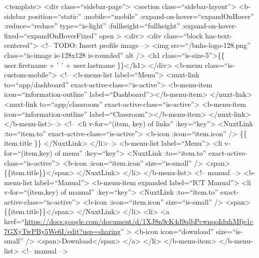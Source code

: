 \documentclass[11pt]{article}
\author{James Paul Pandan}
\date{\today}
\title{}
\begin{document}
\tableofcontents

<template>
  <div class=``sidebar-page''>
    <section class=``sidebar-layout''>
      <b-sidebar
        position=``static''
        :mobile=``mobile''
        :expand-on-hover=``expandOnHover''
        :reduce=``reduce''
        type=``is-light''
        :fullheight=``fullheight''
        :expand-on-hover-fixed=``expandOnHoverFixed''
        open
      >
        <div>
          <div class=``block has-text-centered''>
            <!-- TODO: Insert profile image -->
            <img src=``/bnhs-logo-128.png'' class=``is-image is-128x128 is-rounded'' alt />
            <h1 class=``is-size-5''>\{\{ user.firstname + ' ' + user.lastname \}\}</h1>
          </div>
          <b-menu class=``is-custom-mobile''>
            <!-- <b-menu-list label=``Menu''>
                   <nuxt-link to=``app/dashboard'' exact-active-class=``is-active''>
                   <b-menu-item icon=``information-outline'' label=``Dashboard''></b-menu-item>
                   </nuxt-link>
                   <nuxt-link to=``app/classroom'' exact-active-class=``is-active''>
                   <b-menu-item icon=``information-outline'' label=``Classroom''></b-menu-item>
                   </nuxt-link>
            </b-menu-list>-->
            <!-- <li v-for=``(item, key) of links'' :key=``key''>
                   <NuxtLink :to=``item.to'' exact-active-class=``is-active''>
                   <b-icon :icon=``item.icon'' />
                   \{\{ item.title \}\}
                   </NuxtLink>
            </li>-->
            <b-menu-list label=``Menu''>
              <li v-for=``(item,key) of menu'' :key=``key''>
                <NuxtLink :to=``item.to'' exact-active-class=``is-active''>
                  <b-icon :icon=``item.icon'' size=``is-small'' />
                  <span>\{\{item.title\}\}</span>
                </NuxtLink>
              </li>
            </b-menu-list>
            <!-- manual -->
            <b-menu-list label=``Manual''>
              <b-menu-item expanded label=``ICT Manual''>
                <li v-for=``(item,key) of manual'' :key=``key''>
                  <NuxtLink :to=``item.to'' exact-active-class=``is-active''>
                    <b-icon :icon=``item.icon'' size=``is-small'' />
                    <span>\{\{item.title\}\}</span>
                  </NuxtLink>
                </li>
                <li>
                  <a
                    href=``\url{https://docs.google.com/document/d/1XJ8n9cK4d9qlbPcwnqoIduhMfje1c7GXyTwPBy5We6I/edit?usp=sharing}''
                  >
                    <b-icon icon=``download'' size=``is-small'' />
                    <span>Download</span>
                  </a>
                </li>
              </b-menu-item>
            </b-menu-list>
            <!-- manual -->
\end{document}
